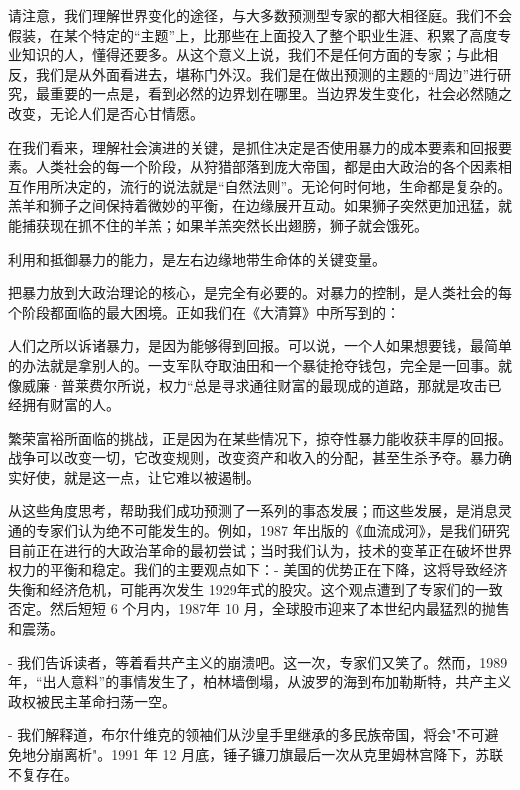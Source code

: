 请注意，我们理解世界变化的途径，与大多数预测型专家的都大相径庭。我们不会假装，在某个特定的“主题”上，比那些在上面投入了整个职业生涯、积累了高度专业知识的人，懂得还要多。从这个意义上说，我们不是任何方面的专家；与此相反，我们是从外面看进去，堪称门外汉。我们是在做出预测的主题的“周边”进行研究，最重要的一点是，看到必然的边界划在哪里。当边界发生变化，社会必然随之改变，无论人们是否心甘情愿。


在我们看来，理解社会演进的关键，是抓住决定是否使用暴力的成本要素和回报要素。人类社会的每一个阶段，从狩猎部落到庞大帝国，都是由大政治的各个因素相互作用所决定的，流行的说法就是“自然法则”。无论何时何地，生命都是复杂的。羔羊和狮子之间保持着微妙的平衡，在边缘展开互动。如果狮子突然更加迅猛，就能捕获现在抓不住的羊羔；如果羊羔突然长出翅膀，狮子就会饿死。


利用和抵御暴力的能力，是左右边缘地带生命体的关键变量。


把暴力放到大政治理论的核心，是完全有必要的。对暴力的控制，是人类社会的每个阶段都面临的最大困境。正如我们在《大清算》中所写到的：

\begin{tcolorbox}

人们之所以诉诸暴力，是因为能够得到回报。可以说，一个人如果想要钱，最简单的办法就是拿别人的。一支军队夺取油田和一个暴徒抢夺钱包，完全是一回事。就像威廉·普莱费尔所说，权力“总是寻求通往财富的最现成的道路，那就是攻击已经拥有财富的人。

繁荣富裕所面临的挑战，正是因为在某些情况下，掠夺性暴力能收获丰厚的回报。战争可以改变一切，它改变规则，改变资产和收入的分配，甚至生杀予夺。暴力确实好使，就是这一点，让它难以被遏制。

\end{tcolorbox}

从这些角度思考，帮助我们成功预测了一系列的事态发展；而这些发展，是消息灵通的专家们认为绝不可能发生的。例如，1987 年出版的《血流成河》，是我们研究目前正在进行的大政治革命的最初尝试；当时我们认为，技术的变革正在破坏世界权力的平衡和稳定。我们的主要观点如下：- 美国的优势正在下降，这将导致经济失衡和经济危机，可能再次发生 1929年式的股灾。这个观点遭到了专家们的一致否定。然后短短 6 个月内，1987年 10 月，全球股市迎来了本世纪内最猛烈的抛售和震荡。


- 我们告诉读者，等着看共产主义的崩溃吧。这一次，专家们又笑了。然而，1989 年，“出人意料”的事情发生了，柏林墙倒塌，从波罗的海到布加勒斯特，共产主义政权被民主革命扫荡一空。


- 我们解释道，布尔什维克的领袖们从沙皇手里继承的多民族帝国，将会"不可避免地分崩离析"。1991 年 12 月底，锤子镰刀旗最后一次从克里姆林宫降下，苏联不复存在。


